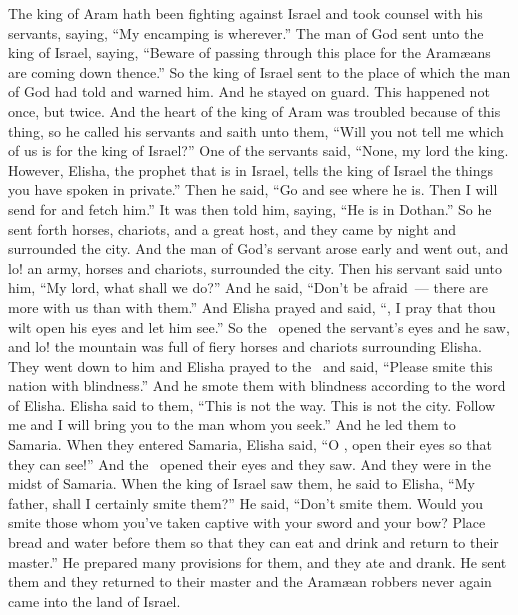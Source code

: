 \begin{inparaenum}
   The king of Aram hath been fighting against Israel and took counsel with his servants, saying, ``My encamping is wherever.''%
   The man of God sent unto the king of Israel, saying, ``Beware of passing through this place for the Aram\ae{}ans are coming down thence.''%
   So the king of Israel sent to the place of which the man of God had told and warned him. And he stayed on guard. This happened not once, but twice.%
   And the heart of the king of Aram was troubled because of this thing, so he called his servants and saith unto them, ``Will you not tell me which of us is for the king of Israel?''%
   One of the servants said, ``None, my lord the king. However, Elisha, the prophet that is in Israel, tells the king of Israel the things you have spoken in private.''%
   Then he said, ``Go and see where he is. Then I will send for and fetch him.'' It was then told him, saying, ``He is in Dothan.''%
   So he sent forth horses, chariots, and a great host, and they came by night and surrounded the city.%
   And the man of God's servant arose early and went out, and lo! an army, horses and chariots, surrounded the city. Then his servant said unto him, ``My lord, what shall we do?''%
   And he said, ``Don't be afraid~--- there are more with us than with them.''%
   And Elisha prayed and said, ``\lord, I pray that thou wilt open his eyes and let him see.'' So the \lord\ opened the servant's eyes and he saw, and lo! the mountain was full of fiery horses and chariots surrounding Elisha.%
   They went down to him and Elisha prayed to the \lord\ and said, ``Please smite this nation with blindness.'' And he smote them with blindness according to the word of Elisha.%
   Elisha said to them, ``This is not the way. This is not the city. Follow me and I will bring you to the man whom you seek.'' And he led them to Samaria.%
   When they entered Samaria, Elisha said, ``O \lord, open their eyes so that they can see!'' And the \lord\ opened their eyes and they saw. And they were in the midst of Samaria.%
   When the king of Israel saw them, he said to Elisha, ``My father, shall I certainly smite them?''%
   He said, ``Don't smite them. Would you smite those whom you've taken captive with your sword and your bow? Place bread and water before them so that they can eat and drink and return to their master.''%
   He prepared many provisions for them, and they ate and drank. He sent them and they returned to their master and the Aram\ae{}an robbers never again came into the land of Israel.%


\end{inparaenum}
